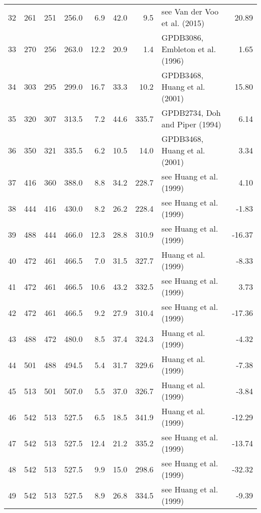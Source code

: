 \documentclass[11pt]{article}
\begin{document}
\begin{sidewaystable}
{\begin{tabular}{lrrrrrrlr}
32 &       261 &      251 &       256.0 &   6.9 &  42.0 &    9.5 &     see Van der Voo et al. (2015) &     20.89 \\
33 &       270 &      256 &       263.0 &  12.2 &  20.9 &    1.4 &  GPDB3086, Embleton et al. (1996) &      1.65 \\
34 &       303 &      295 &       299.0 &  16.7 &  33.3 &   10.2 &     GPDB3468, Huang et al. (2001) &     15.80 \\
35 &       320 &      307 &       313.5 &   7.2 &  44.6 &  335.7 &    GPDB2734, Doh and Piper (1994) &      6.14 \\
36 &       350 &      321 &       335.5 &   6.2 &  10.5 &   14.0 &     GPDB3468, Huang et al. (2001) &      3.34 \\
37 &       416 &      360 &       388.0 &   8.8 &  34.2 &  228.7 &           see Huang et al. (1999) &      4.10 \\
38 &       444 &      416 &       430.0 &   8.2 &  26.2 &  228.4 &           see Huang et al. (1999) &     -1.83 \\
39 &       488 &      444 &       466.0 &  12.3 &  28.8 &  310.9 &           see Huang et al. (1999) &    -16.37 \\
40 &       472 &      461 &       466.5 &   7.0 &  31.5 &  327.7 &               Huang et al. (1999) &     -8.33 \\
41 &       472 &      461 &       466.5 &  10.6 &  43.2 &  332.5 &           see Huang et al. (1999) &      3.73 \\
42 &       472 &      461 &       466.5 &   9.2 &  27.9 &  310.4 &           see Huang et al. (1999) &    -17.36 \\
43 &       488 &      472 &       480.0 &   8.5 &  37.4 &  324.3 &               Huang et al. (1999) &     -4.32 \\
44 &       501 &      488 &       494.5 &   5.4 &  31.7 &  329.6 &               Huang et al. (1999) &     -7.38 \\
45 &       513 &      501 &       507.0 &   5.5 &  37.0 &  326.7 &               Huang et al. (1999) &     -3.84 \\
46 &       542 &      513 &       527.5 &   6.5 &  18.5 &  341.9 &               Huang et al. (1999) &    -12.29 \\
47 &       542 &      513 &       527.5 &  12.4 &  21.2 &  335.2 &           see Huang et al. (1999) &    -13.74 \\
48 &       542 &      513 &       527.5 &   9.9 &  15.0 &  298.6 &           see Huang et al. (1999) &    -32.32 \\
49 &       542 &      513 &       527.5 &   8.9 &  26.8 &  334.5 &           see Huang et al. (1999) &     -9.39 \\
\bottomrule
\end{tabular}}
\end{sidewaystable}
    
\end{document}
